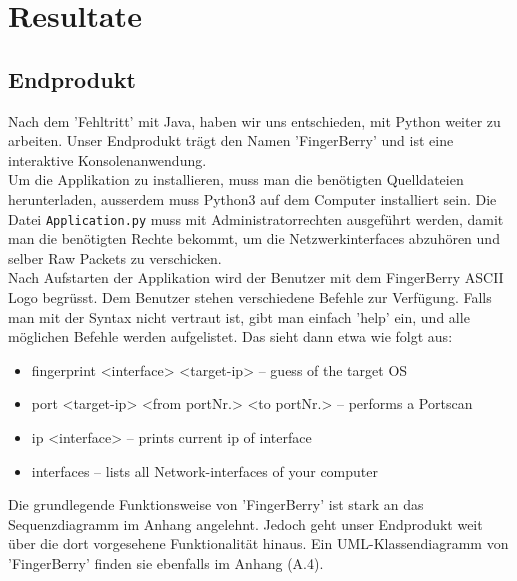 \documentclass{article} %
\begin{document}
\section{Resultate}
\subsection{Endprodukt}
Nach dem 'Fehltritt' mit Java, haben wir uns entschieden, mit Python weiter zu arbeiten. Unser Endprodukt tr\"{a}gt den Namen 'FingerBerry' und ist eine interaktive Konsolenanwendung.\\
Um die Applikation zu installieren, muss man die ben\"otigten Quelldateien herunterladen, ausserdem muss Python3 auf dem Computer installiert sein. Die Datei \texttt{Application.py} muss mit Administratorrechten ausgef\"uhrt werden, damit man die ben\"otigten Rechte bekommt, um die Netzwerkinterfaces abzuh\"oren und selber Raw Packets zu verschicken. \\
Nach Aufstarten der Applikation wird der Benutzer mit dem FingerBerry ASCII Logo begr\"{u}sst. Dem Benutzer stehen verschiedene Befehle zur Verf\"{u}gung. Falls man mit der Syntax nicht vertraut ist, gibt man einfach 'help' ein, und alle möglichen Befehle werden aufgelistet. Das sieht dann etwa wie folgt aus:
\begin{itemize}
	\item fingerprint <interface> <target-ip> -- guess of the target OS
	\item port <target-ip> <from portNr.> <to portNr.> -- performs a Portscan
	\item ip <interface> -- prints current ip of interface
	\item interfaces -- lists all Network-interfaces of your computer
\end{itemize}
Die grundlegende Funktionsweise von 'FingerBerry' ist stark an das Sequenzdiagramm im Anhang angelehnt. Jedoch geht unser Endprodukt weit über die dort vorgesehene Funktionalität hinaus. Ein UML-Klassendiagramm von 'FingerBerry' finden sie ebenfalls im Anhang (A.4). 
\newpage
\end{document}
